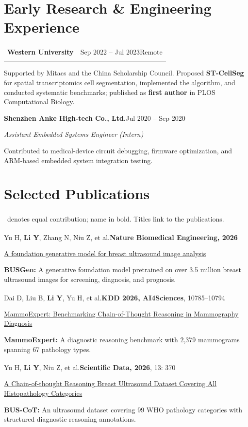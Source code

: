 \documentclass[10pt,a4paper]{article}
\makeatletter
\newcommand{\entry}[3]{%
  \needspace{4\baselineskip}%
  \begin{tabularx}{\linewidth}{@{}>{\raggedright\arraybackslash}X r@{}}%
    \textbf{#1} & {\small\color{muted}#2}\\[-1pt]
    \multicolumn{2}{@{}l@{}}{{\small\color{muted}#3}}
  \end{tabularx}\par\vspace{1pt}}
\newcommand{\pub}[4]{%
  \needspace{4\baselineskip}%
  {\small #1\par\vspace{-1pt}
   \href{#2}{#3}\par\vspace{-1pt}
   {\color{muted}#4}\par}\vspace{4pt}}
\newcommand{\me}{\textbf{Li Y}}
\newcommand{\equal}{\textsuperscript{\dag}}
\makeatother
\begin{document}
\section{Early Research \& Engineering Experience}
\entry{Western University}{Sep 2022 -- Jul 2023\quad Remote}{Research Assistant\quad\textbar\quad Advisor: Prof. Pingzhao Hu}
Supported by Mitacs and the China Scholarship Council. Proposed \textbf{ST-CellSeg} for spatial transcriptomics cell segmentation, implemented the algorithm, and conducted systematic benchmarks; published as \textbf{first author} in PLOS Computational Biology.

\vspace{4pt}
{\small\textbf{Shenzhen Anke High-tech Co., Ltd.}\hfill\textcolor{muted}{Jul 2020 -- Sep 2020}\par
\textit{Assistant Embedded Systems Engineer (Intern)}\par
Contributed to medical-device circuit debugging, firmware optimization, and ARM-based embedded system integration testing.}

\newpage
\section{Selected Publications}
{\footnotesize\color{muted}\equal\ denotes equal contribution; name in bold. Titles link to the publications.}\par\vspace{2pt}

\pub{Yu H\equal, \me\equal, Zhang N\equal, Niu Z\equal, et al.\quad\textbf{Nature Biomedical Engineering, 2026}}
{https://doi.org/10.1038/s41551-026-01639-1}
{A foundation generative model for breast ultrasound image analysis}
{\textbf{BUSGen:} A generative foundation model pretrained on over 3.5 million breast ultrasound images for screening, diagnosis, and prognosis.}

\pub{Dai D\equal, Liu B\equal, \me\equal, Yu H\equal, et al.\quad\textbf{KDD 2026, AI4Sciences}, 10785--10794}
{https://doi.org/10.1145/3770855.3818933}
{MammoExpert: Benchmarking Chain-of-Thought Reasoning in Mammography Diagnosis}
{\textbf{MammoExpert:} A diagnostic reasoning benchmark with 2,379 mammograms spanning 67 pathology types.}

\pub{Yu H\equal, \me\equal, Niu Z\equal, et al.\quad\textbf{Scientific Data, 2026}, 13: 370}
{https://doi.org/10.1038/s41597-026-06702-9}
{A Chain-of-thought Reasoning Breast Ultrasound Dataset Covering All Histopathology Categories}
{\textbf{BUS-CoT:} An ultrasound dataset covering 99 WHO pathology categories with structured diagnostic reasoning annotations.}
\end{document}
